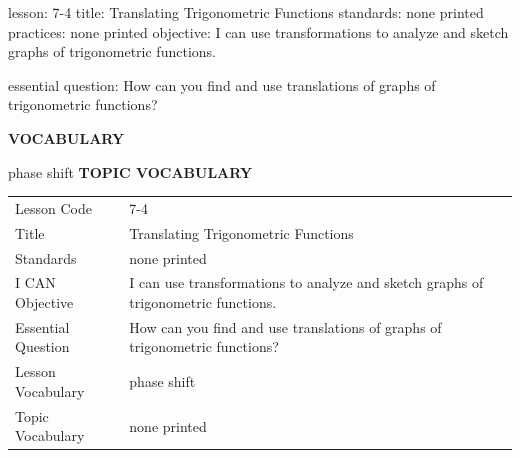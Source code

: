 \documentclass{article}
\newenvironment{lesson-meta}{}{}        %
\newcommand{\te}[1]{}                   %
\begin{document}
\begin{lesson-meta}
lesson: 7-4
title: Translating Trigonometric Functions
standards: none printed
practices: none printed
objective: I can use transformations to analyze and sketch graphs of trigonometric functions.

essential question: How can you find and use translations of graphs of trigonometric functions?

\textbf{VOCABULARY}
\item phase shift
\textbf{TOPIC VOCABULARY}
\te{No topic vocabulary list is printed on these pages.}
\begin{tabular}{ll}
Lesson Code & 7-4 \\
Title & Translating Trigonometric Functions \\
Standards & none printed \\
I CAN Objective & I can use transformations to analyze and sketch graphs of trigonometric functions. \\
Essential Question & How can you find and use translations of graphs of trigonometric functions? \\
Lesson Vocabulary & phase shift \\
Topic Vocabulary & none printed \\
\end{tabular}
\end{lesson-meta}
\end{document}
